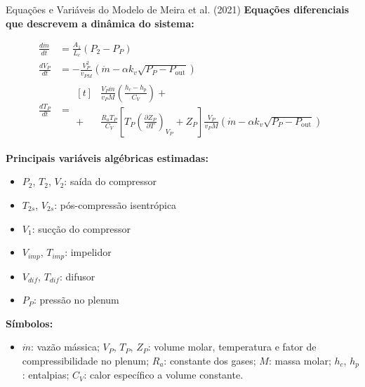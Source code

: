 \begin{frame}{Equações e Variáveis do Modelo de Meira et al. (2021)}
    \scriptsize
    \textbf{Equações diferenciais que descrevem a dinâmica do sistema:}

    \begin{multicols}{2}
    \begin{align}
        \frac{d\dot{m}}{dt} &= \frac{A_1}{L_c}(P_2 - P_P) \tag{1} \\
        \frac{dV_P}{dt} &= -\frac{V_P^2}{v_{PM}} \left( \dot{m} - \alpha k_v \sqrt{P_P - P_{\text{out}}} \right) \tag{2} \\
        \frac{dT_P}{dt} &= 
        \begin{aligned}[t]
            &\frac{V_P \dot{m}}{v_P M} \left( \frac{h_c - h_p}{C_V} \right) + \\
            + &\frac{R_a T_P}{C_V} \left[ T_P \left( \frac{\partial Z_P}{\partial T} \right)_{V_P} + Z_P \right]
            \frac{V_P}{v_P M} \left( \dot{m} - \alpha k_v \sqrt{P_P - P_{\text{out}}} \right)
        \end{aligned} \tag{3}
    \end{align}

    \columnbreak
    \begin{minipage}{\linewidth}
        \raggedleft
        \textbf{Principais variáveis algébricas estimadas:}
        \begin{itemize}
            \item \( P_2 \), \( T_2 \), \( V_2 \): saída do compressor
            \item \( T_{2s} \), \( V_{2s} \): pós-compressão isentrópica
            \item \( V_1 \): sucção do compressor
            \item \( V_{imp} \), \( T_{imp} \): impelidor
            \item \( V_{dif} \), \( T_{dif} \): difusor
            \item \( P_P \): pressão no plenum
        \end{itemize}
    \end{minipage}
    \end{multicols}

    \vspace{0.2cm}
    \textbf{Símbolos:}
    \begin{itemize}
        \item \( \dot{m} \): vazão mássica; 
        \( V_P \), \( T_P \), \( Z_P \): volume molar, temperatura e fator de compressibilidade no plenum;
        \( R_a \): constante dos gases; 
        \( M \): massa molar; 
        \( h_c \), \( h_p \): entalpias; 
        \( C_V \): calor específico a volume constante.
    \end{itemize}
\end{frame}

